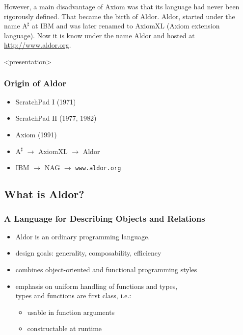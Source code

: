 However, a main disadvantage of Axiom was that its language had never
been rigorously defined. That became the birth of Aldor. Aldor,
started under the name $\mathrm{A}^\sharp$ at IBM and was later renamed to
AxiomXL (Axiom extension language). Now it is know under the name
Aldor and hosted at \url{http://www.aldor.org}.




\begin{frame}<presentation>
  \frametitle{Origin of Aldor}
  \begin{itemize}
  \item ScratchPad I (1971) %
  \item ScratchPad II (1977, %
    1982) %
  \item Axiom (1991)
  \item $\mathrm{A}^\sharp$ $\longrightarrow$ AxiomXL $\longrightarrow$ Aldor
  \item IBM $\longrightarrow$ NAG $\longrightarrow$ \texttt{www.aldor.org}
  \end{itemize}
\end{frame}













\subsection{What is Aldor?}

\begin{frame}
  \frametitle{\textbf{A} \textbf{L}anguage for \textbf{D}escribing
    \textbf{O}bjects and \textbf{R}elations}
  \begin{itemize}
  \item Aldor is an ordinary programming language.
  \item design goals: generality, composability, efficiency
  \item combines object-oriented and functional programming styles 
  \item emphasis on uniform handling of functions and types,\\
    types and functions are \alert{first class}, i.e.:
    \begin{itemize}
    \item usable in function arguments
    \item constructable at runtime
    \end{itemize}
  \end{itemize}
\end{frame}









